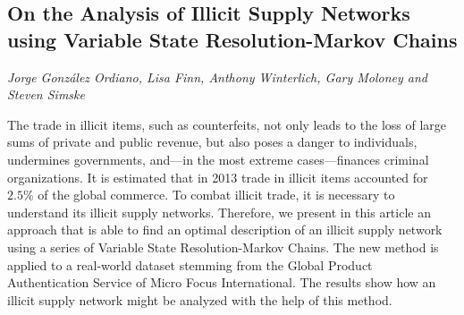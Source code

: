 \documentclass[../booklet.tex]{subfiles}
\begin{document}
\subsection[On the Analysis of Illicit Supply Networks using Variable State Resolution-Markov Chains. {\it Jorge González Ordiano, Lisa Finn, Anthony Winterlich, Gary Moloney and Steven Simske}]{On the Analysis of Illicit Supply Networks using Variable State Resolution-Markov Chains}
    

\begin{center}
  {\it Jorge González Ordiano, Lisa Finn, Anthony Winterlich, Gary Moloney and Steven Simske}
\end{center}



The trade in illicit items, such as counterfeits, not only leads to the loss of large sums of private and public revenue, but also poses a danger to individuals, undermines governments, and---in the most extreme cases---finances criminal organizations. It is estimated that in 2013 trade in illicit items accounted for $2.5\%$ of the global commerce. To combat illicit trade, it is necessary to understand its illicit supply networks. Therefore, we present in this article an approach that is able to find an optimal description of an illicit supply network using a series of Variable State Resolution-Markov Chains. The new method is applied to a real-world dataset stemming from the Global Product Authentication Service of Micro Focus International. The results show how an illicit supply network might be analyzed with the help of this method.

\end{document}
